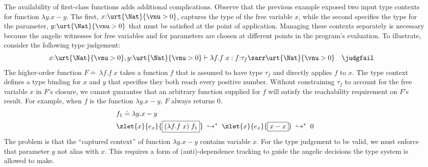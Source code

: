 The availability of first-class functions adds additional
complications.  Observe that the previous example exposed two input
type contexts for function $\lambda y.x - y$.  The first,
$x{:}\urt{\Nat}{\vnu > 0}$, captures the type of the free variable
$x$, while the second specifies the type for the parameter,
$y{:}\urt{\Nat}{\vnu > 0}$ that must be satisfied at the point of
application.  Managing these contexts separately is necessary because
the angelic witnesses for free variables and for parameters are chosen
at different points in the program's evaluation. To illustrate,
consider the following type judgement:
\begin{align*}
    x{:}\urt{\Nat}{\vnu > 0}, y{:}\urt{\Nat}{\vnu > 0} &\vdash  \lambda f. f\;x : f{:}\tau_f \sarr \urt{\Nat}{\vnu > 0} \quad\judgfail
\end{align*}\noindent
The higher-order function $F \doteq\ \lambda f. f\;x$ takes a function
$f$ that is assumed to have type $\tau_f$ and directly applies $f$ to
$x$.  The type context defines a type binding for $x$ and $y$ that
specifies they both reach every positive number.  Without constraining
$\tau_f$ to account for the free variable $x$ in $F$'s closure,
we cannot guarantee that an arbitrary function supplied for $f$ will
satisfy the reachability requirement on $F$'s result.  For example,
when $f$ is the function $\lambda y.x - y$, $F$ always returns $0$.
\begin{align*}
    &f_1 \doteq \lambda y.x - y \quad 
    \\&\zlet{x}{e_x}{\boxed{(\lambda f. f\;x)\;f_1}} \;\hookrightarrow^*\; \zlet{x}{e_x}{\boxed{x - x}} \;\hookrightarrow^*\; 0 
\end{align*}\noindent
The problem is that the ``captured context'' of function $\lambda y.x
- y$ contains variable $x$.  For the type judgement to be valid, we
must enforce that parameter $y$ not alias with $x$.  This requires
a form of (anti)-dependence tracking to guide the angelic decisions
the type system is allowed to make.

